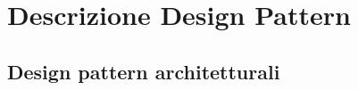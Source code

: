 %




\section{Descrizione Design Pattern} %
\label{sec:descdp}
	\subsection{Design pattern architetturali} %
	

